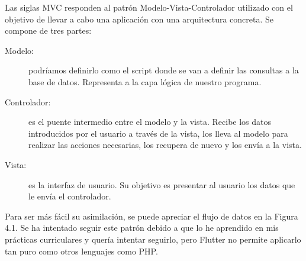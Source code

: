 	Las siglas MVC responden al patrón Modelo-Vista-Controlador utilizado con el objetivo de llevar a cabo una aplicación con una arquitectura concreta. Se compone de tres partes:
	\begin{description}
		\item [Modelo:] podríamos definirlo como el script donde se van a definir las consultas a la base de datos. Representa a la capa lógica de nuestro programa.
		\item [Controlador:] es el puente intermedio entre el modelo y la vista. Recibe los datos introducidos por el usuario a través de la vista, los lleva al modelo para realizar las acciones necesarias, los recupera de nuevo y los envía a la vista.
		\item [Vista:] es la interfaz de usuario. Su objetivo es presentar al usuario los datos que le envía el controlador.
	\end{description}
	
	Para ser más fácil su asimilación, se puede apreciar el flujo de datos en la Figura 4.1. Se ha intentado seguir este patrón debido a que lo he aprendido en mis prácticas curriculares y quería intentar seguirlo, pero Flutter no permite aplicarlo tan puro como otros lenguajes como PHP.
	
